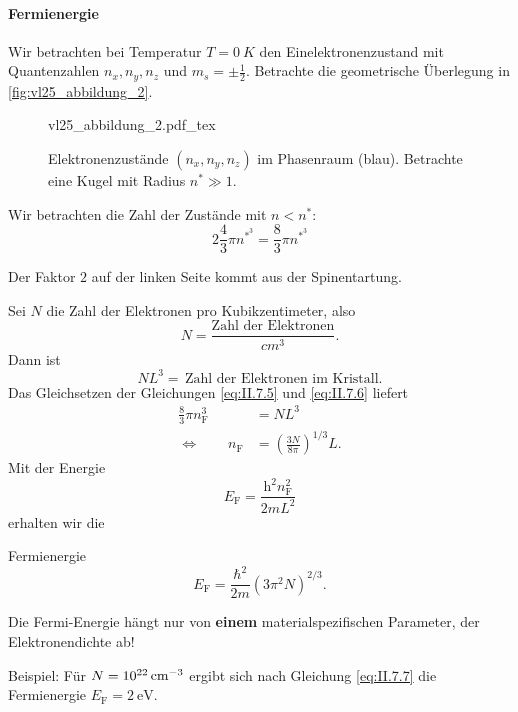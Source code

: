 \paragraph{Fermienergie}
	Wir betrachten bei Temperatur $T=\SI{0}{K}$ den Einelektronenzustand mit Quantenzahlen $n_x, n_y, n_z$ und $m_s=\pm\frac12$. Betrachte die geometrische Überlegung in \autoref{fig:vl25_abbildung_2}.

	
	\begin{figure}[H]
		\centering
		\def\svgwidth{0.39\columnwidth}
		{vl25_abbildung_2.pdf_tex}
		\caption{Elektronenzustände $(n_x, n_y, n_z)$ im Phasenraum (blau). Betrachte eine Kugel mit Radius $n^\ast\gg1$.}
		\label{fig:vl25_abbildung_2}
	\end{figure}
	Wir betrachten die Zahl der Zustände mit $n<n^\ast$:
	\begin{equation}
		\label{eq:II.7.5}
		2 \frac{4}{3} \pi n^{*^{3}} = \frac{8}{3} \pi n^{*^3}
	\end{equation}
	\begin{verbal}
		Der Faktor $2$ auf der linken Seite kommt aus der Spinentartung.
	\end{verbal}
	Sei $N$ die Zahl der Elektronen pro Kubikzentimeter, also
	$$
	N=\frac{\text{Zahl der Elektronen}}{\unit{cm^3}}.
	$$
	Dann ist
	\begin{equation}
		\label{eq:II.7.6}
		NL^3 = \,\text{Zahl der Elektronen im Kristall}.
	\end{equation}
	Das Gleichsetzen der Gleichungen \eqref{eq:II.7.5} und \eqref{eq:II.7.6} liefert
	$$
	\begin{aligned}
		\frac{8}{3} \pi n_\mathrm{F}^3 &= NL^3 \\
		\Leftrightarrow \qquad n_\mathrm{F} &= \left( \frac{3N}{8\pi} \right)^{1 /3} L.
	\end{aligned}
	$$
	Mit der Energie 
	$$
	E_\mathrm{F} = \frac{\mathrm{h}^2 n_\mathrm{F}^2}{2mL^2}
	$$ 
	erhalten wir die
	\begin{important}
		Fermienergie
		\begin{equation}
			\label{eq:II.7.7}
			E_\mathrm{F} = \frac{\hbar ^2}{2m} \left( 3\pi^2 N \right) ^{2 /3}.
		\end{equation}
	\end{important}
	Die Fermi-Energie hängt nur von \textbf{einem} materialspezifischen Parameter, der Elektronendichte ab! 
	
	Beispiel: Für $N=\SI{e 22}{\centi\meter^{-3}}$ ergibt sich nach Gleichung \eqref{eq:II.7.7} die Fermienergie $E_\mathrm{F} = \SI{2}{\electronvolt}$. 
	
